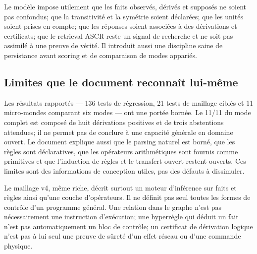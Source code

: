 \documentclass[11pt,a4paper]{article}
\begin{document}
Le modèle impose utilement que les faits observés, dérivés et supposés ne soient pas confondus; que la transitivité et la symétrie soient déclarées; que les unités soient prises en compte; que les réponses soient associées à des dérivations et certificats; que le retrieval ASCR reste un signal de recherche et ne soit pas assimilé à une preuve de vérité. Il introduit aussi une discipline saine de persistance avant scoring et de comparaison de modes appariés.

\subsection{Limites que le document reconnaît lui-même}
Les résultats rapportés — 136 tests de régression, 21 tests de maillage ciblés et 11 micro-mondes comparant six modes — ont une portée bornée. Le 11/11 du mode complet est composé de huit dérivations positives et de trois abstentions attendues; il ne permet pas de conclure à une capacité générale en domaine ouvert. Le document explique aussi que le parsing naturel est borné, que les règles sont déclaratives, que les opérateurs arithmétiques sont fournis comme primitives et que l'induction de règles et le transfert ouvert restent ouverts. Ces limites sont des informations de conception utiles, pas des défauts à dissimuler.

Le maillage v4, même riche, décrit surtout un moteur d'inférence sur faits et règles ainsi qu'une couche d'opérateurs. Il ne définit pas seul toutes les formes de contrôle d'un programme général. Une relation dans le graphe n'est pas nécessairement une instruction d'exécution; une hyperrègle qui déduit un fait n'est pas automatiquement un bloc de contrôle; un certificat de dérivation logique n'est pas à lui seul une preuve de sûreté d'un effet réseau ou d'une commande physique.
\end{document}
